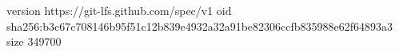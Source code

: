 version https://git-lfs.github.com/spec/v1
oid sha256:b3c67c708146b95f51c12b839e4932a32a91be82306ccfb835988e62f64893a3
size 349700
